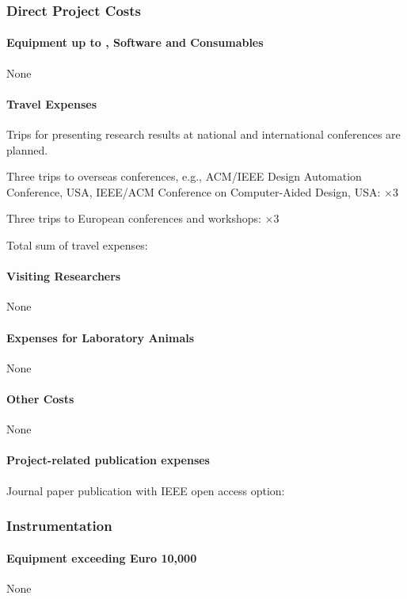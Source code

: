 \vskip 12pt
\subsubsection{Direct Project Costs}

\paragraph{Equipment up to , Software and Consumables}
None
\vskip 8pt

\paragraph{Travel Expenses}
Trips for presenting research results at national and international
conferences are planned.

Three trips to overseas conferences, e.g., ACM/IEEE Design Automation
Conference, USA, IEEE/ACM Conference on Computer-Aided Design, USA:
$\times$3

Three trips to European conferences and workshops:
$\times$3

Total sum of travel expenses: 


\vskip 12pt
\paragraph{Visiting Researchers}
None
\vskip 8pt
\paragraph{Expenses for Laboratory Animals}
None
\vskip 8pt
\paragraph{Other Costs}
None
\vskip 8pt
\paragraph{Project-related publication expenses}
Journal paper publication with IEEE open access option: 

\vskip 12pt
\subsubsection{Instrumentation}
\paragraph{Equipment exceeding Euro 10,000}
None
\vskip 8pt
